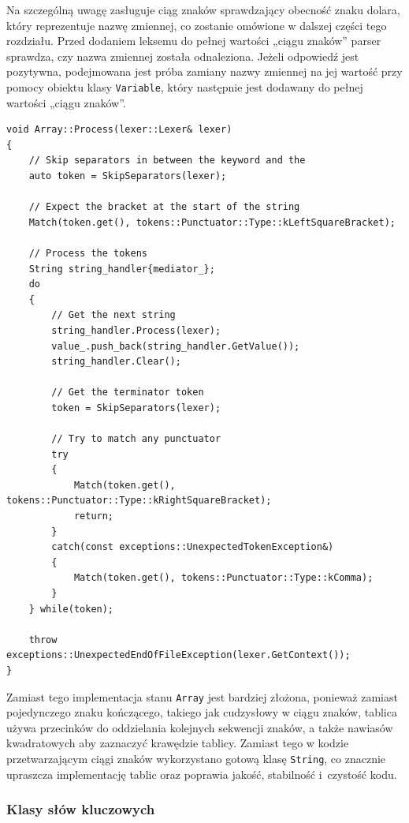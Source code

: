 Na szczególną uwagę zasługuje ciąg znaków sprawdzający obecność znaku dolara, który reprezentuje nazwę zmiennej, co zostanie omówione w dalszej części tego rozdziału. Przed dodaniem leksemu do pełnej wartości „ciągu znaków” parser sprawdza, czy nazwa zmiennej została odnaleziona. Jeżeli odpowiedź jest pozytywna, podejmowana jest próba zamiany nazwy zmiennej na jej wartość przy pomocy obiektu klasy \texttt{Variable}, który następnie jest dodawany do pełnej wartości „ciągu znaków”.


\begin{lstlisting}[label=list:array,caption=Metoda Array::Process(),basicstyle=\footnotesize\ttfamily]
void Array::Process(lexer::Lexer& lexer)
{
    // Skip separators in between the keyword and the
    auto token = SkipSeparators(lexer);

    // Expect the bracket at the start of the string
    Match(token.get(), tokens::Punctuator::Type::kLeftSquareBracket);

    // Process the tokens
    String string_handler{mediator_};
    do
    {
        // Get the next string
        string_handler.Process(lexer);
        value_.push_back(string_handler.GetValue());
        string_handler.Clear();

        // Get the terminator token
        token = SkipSeparators(lexer);

        // Try to match any punctuator
        try
        {
            Match(token.get(), tokens::Punctuator::Type::kRightSquareBracket);
            return;
        }
        catch(const exceptions::UnexpectedTokenException&)
        {
            Match(token.get(), tokens::Punctuator::Type::kComma);
        }
    } while(token);

    throw exceptions::UnexpectedEndOfFileException(lexer.GetContext());
}
\end{lstlisting}

Zamiast tego implementacja stanu \texttt{Array} jest bardziej złożona, ponieważ zamiast pojedynczego znaku kończącego, takiego jak cudzysłowy w ciągu znaków, tablica używa przecinków do oddzielania kolejnych sekwencji znaków, a także nawiasów kwadratowych aby zaznaczyć krawędzie tablicy. Zamiast tego w kodzie przetwarzającym ciągi znaków wykorzystano gotową klasę \texttt{String}, co znacznie upraszcza implementację tablic oraz poprawia jakość, stabilność i~czystość kodu.

\subsubsection{Klasy słów kluczowych}

